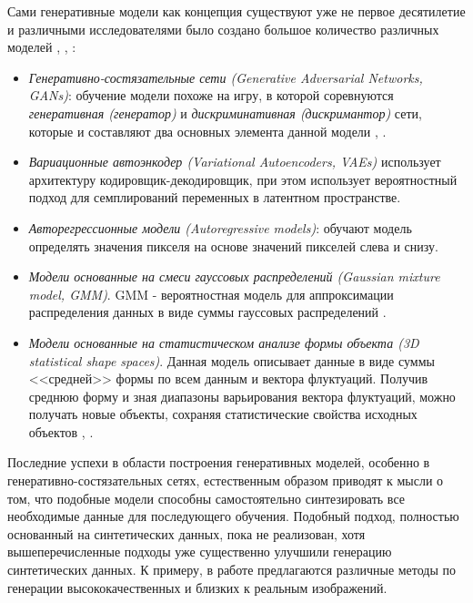 Сами генеративные модели как концепция существуют уже не первое десятилетие и различными исследователями было создано большое количество различных моделей \cite{sanchez-at-glance}, \cite{lrgm-cloud}, :

\begin{itemize}

\item \textit{Генеративно-состязательные сети (Generative Adversarial Networks, GANs)}: обучение модели похоже на игру, в которой соревнуются \textit{генеративная (генератор)} и \textit{дискриминативная (дискримантор)} сети, которые и составляют два основных элемента данной модели \cite{gan-1}, \cite{gan-super}.

\item \textit{Вариационные автоэнкодер (Variational Autoencoders, VAEs)} использует архитектуру кодировщик-декодировщик, при этом использует вероятностный подход для семплирований переменных в латентном пространстве.


\item \textit{Авторегрессионные модели (Autoregressive models)}: обучают модель определять значения пикселя на основе значений пикселей слева и снизу.

\item \textit{Модели основанные на смеси гауссовых распределений (Gaussian mixture model, GMM)}. GMM - вероятностная модель для аппроксимации распределения данных в виде суммы гауссовых распределений \cite{bishop}.

\item \textit{Модели основанные на статистическом анализе формы объекта (3D statistical shape spaces)}. Данная модель описывает данные в виде суммы <<средней>> формы по всем данным и вектора флуктуаций. Получив среднюю форму и зная диапазоны варьирования вектора флуктуаций, можно получать новые объекты, сохраняя статистические свойства исходных объектов \cite{stat-shape-1}, \cite{stat-shape-2}.

\end{itemize}

Последние успехи в области построения генеративных моделей, особенно в генеративно-состязательных сетях, естественным образом приводят к мысли о том, что подобные модели способны самостоятельно синтезировать все необходимые данные для последующего обучения. Подобный подход, полностью основанный на синтетических данных, пока не реализован, хотя вышеперечисленные подходы уже существенно улучшили генерацию синтетических данных. К примеру, в работе \cite{Shrivastava-gap-real} предлагаются различные методы по генерации высококачественных и близких к реальным изображений.

